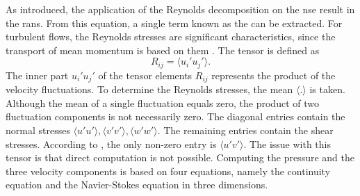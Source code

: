 As  introduced,  the application of the Reynolds decomposition on the \acrshort{nse} result in the \acrshort{rans}.
From this equation, a single term known as the  can be extracted.
For turbulent flows, the Reynolds stresses are significant characteristics, since the transport of mean momentum is based on them \citep{moin_fundamentals_2024}. 
The tensor is defined as 
\begin{equation}
    R_{ij} =  \langle u_i' u_j'\rangle.
\end{equation}
The inner part $u_i' u_j'$ of the tensor elements $R_{ij}$ represents the product of the velocity fluctuations.
To determine the Reynolds stresses, the mean $\langle . \rangle$  is taken.
Although the mean of a single fluctuation equals zero, the product of two fluctuation components is not necessarily zero. 
The diagonal entries contain the normal stresses $\langle u' u'\rangle, \langle v' v'\rangle, \langle w' w'\rangle$.
The remaining entries contain the shear stresses.
According to \citep{schlichting_boundary-layer_2017}, the only non-zero entry is $\langle u' v'\rangle$.
The issue with this tensor is that direct computation is not possible.
%
Computing the pressure and the three velocity components is based on  four equations, namely the continuity equation and the Navier-Stokes equation in three dimensions.

